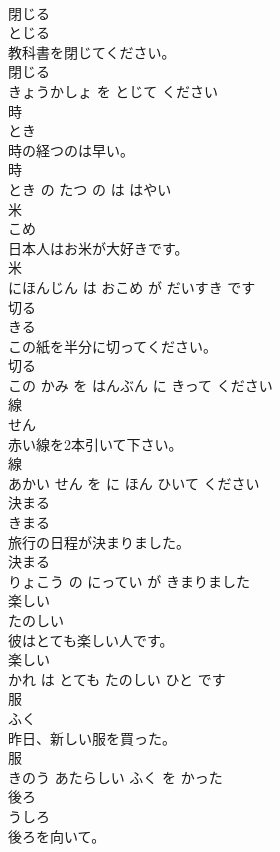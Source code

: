 \documentclass[8pt]{extreport}
\begin{document}
\begin{CJK}{UTF8}{min}
\\	閉じる	
\\	とじる			
\\	教科書を閉じてください。	
\\	閉じる 
\\	きょうかしょ を とじて ください			
\\	時	
\\	とき			
\\	時の経つのは早い。	
\\	時 
\\	とき の たつ の は はやい			
\\	米	
\\	こめ			
\\	日本人はお米が大好きです。	
\\	米 
\\	にほんじん は おこめ が だいすき です			
\\	切る	
\\	きる			
\\	この紙を半分に切ってください。	
\\	切る 
\\	この かみ を はんぶん に きって ください			
\\	線	
\\	せん			
\\	赤い線を2本引いて下さい。	
\\	線 
\\	あかい せん を に ほん ひいて ください			
\\	決まる	
\\	きまる			
\\	旅行の日程が決まりました。	
\\	決まる 
\\	りょこう の にってい が きまりました			
\\	楽しい	
\\	たのしい			
\\	彼はとても楽しい人です。	
\\	楽しい 
\\	かれ は とても たのしい ひと です			
\\	服	
\\	ふく			
\\	昨日、新しい服を買った。	
\\	服 
\\	きのう あたらしい ふく を かった			
\\	後ろ	
\\	うしろ			
\\	後ろを向いて。	

\end{CJK}
\end{document}
